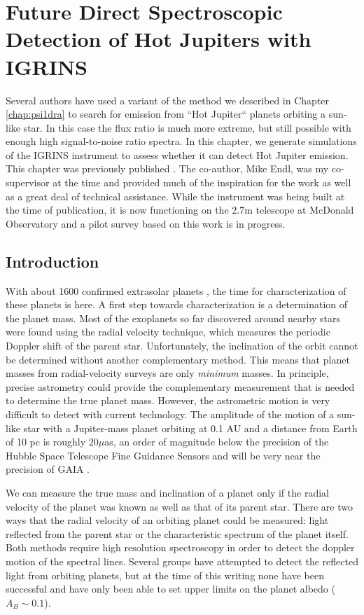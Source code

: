 

\chapter{Future Direct Spectroscopic Detection of Hot Jupiters with IGRINS}
\label{chap:hotjup}
Several authors have used a variant of the method we described in  Chapter \ref{chap:psi1dra} to search for emission from ``Hot Jupiter`` planets orbiting a sun-like star. In this case the flux ratio is much more extreme, but still possible with enough high signal-to-noise ratio spectra. In this chapter, we generate simulations of the IGRINS instrument to assess whether it can detect Hot Jupiter emission. This chapter was previously published \citep{Gullikson2013}. The co-author, Mike Endl, was my co-supervisor at the time and provided much of the inspiration for the work as well as a great deal of technical assistance. While the instrument was being built at the time of publication, it is now functioning on the 2.7m telescope at McDonald Observatory and a pilot survey based on this work is in progress.


\section{Introduction}
With about 1600 confirmed extrasolar planets \citep[from
exoplanets.org:][]{exoplanet}, the time for characterization of these
planets is here. A first step towards characterization is a determination of
the planet mass. Most of the exoplanets so far discovered around nearby stars were
found using the radial velocity technique, which measures the periodic
Doppler shift of the parent star. Unfortunately, the inclination of the orbit cannot be determined
without another complementary method. This means that planet masses from
radial-velocity surveys are only \emph{minimum} masses. In principle, precise astrometry could provide the complementary measurement that is needed to determine the true planet mass. However, the astrometric motion is very difficult to detect with current technology. The amplitude of the motion of a sun-like star with a Jupiter-mass planet orbiting at 0.1 AU and a distance from Earth of 10 pc is roughly $20 \mu$as, an order of magnitude below the precision of the Hubble Space Telescope Fine Guidance Sensors \citep{Benedict2006} and will be very near the precision of GAIA \citep{Sozzetti2001}.

We can measure the true mass and inclination of a planet only if the
radial velocity of the planet was known as well as that of its parent
star. There are two ways that the
radial velocity of an orbiting planet could be measured: light
reflected from the parent star or the characteristic spectrum of the planet itself. Both methods require high resolution spectroscopy in order to detect the doppler motion of the spectral lines. Several groups have
attempted to detect the reflected light from orbiting planets, but at
the time of this writing none have been successful \citep{Collier2002,
  Rodler2008, Rodler2010, Langford2011} and have only been able to set upper limits on the planet albedo ($A_B \sim 0.1
$).

